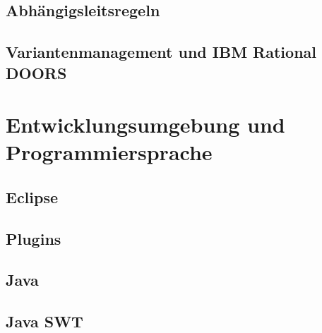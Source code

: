 \subsection{Abhängigsleitsregeln}
\paragraph{}



\subsection{Variantenmanagement und IBM Rational DOORS}
\paragraph{}



\section{Entwicklungsumgebung und Programmiersprache}
\paragraph{}

\subsection{Eclipse}
\paragraph{}


\subsection{Plugins}
\paragraph{}


\subsection{Java}
\paragraph{}


\subsection{Java SWT}
\paragraph{}